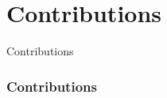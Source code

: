 \section{Contributions}

\begin{frame}
     \begin{center}
     	\huge Contributions
     \end{center}
\end{frame}

\begin{frame}
\frametitle{Contributions}

\end{frame}